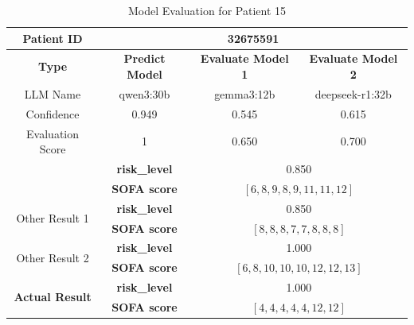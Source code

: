 \begin{table}[htbp]
 \centering
 \caption{Model Evaluation for Patient 15}
 \label{tab:patient15}
 \begin{tabular}{cccc}
 \toprule
 \textbf{ Patient ID } & \multicolumn{3}{c}{32675591} \\
 \midrule
 \textbf{ Type } & \textbf{ Predict Model } & \textbf{ Evaluate Model 1 } & \textbf{ Evaluate Model 2 } \\
 LLM Name & qwen3:30b & gemma3:12b & deepseek-r1:32b \\
 Confidence & 0.949 & 0.545 & 0.615 \\
 Evaluation Score & 1 & 0.650 & 0.700 \\
 \midrule
 \addlinespace
 \multirow{2}{*}{\textbf{ Best Result }} & \textbf{ risk\_level } & \multicolumn{2}{c}{0.850} \\
      & \textbf{ SOFA score } & \multicolumn{2}{c}{$[6, 8, 9, 8, 9, 11, 11, 12]$} \\
 \midrule
 \multirow{2}{*}{Other Result 1} & \textbf{ risk\_level } & \multicolumn{2}{c}{0.850} \\
      & \textbf{ SOFA score } & \multicolumn{2}{c}{$[8, 8, 8, 7, 7, 8, 8, 8]$} \\
 \midrule
 \multirow{2}{*}{Other Result 2} & \textbf{ risk\_level } & \multicolumn{2}{c}{1.000} \\
      & \textbf{ SOFA score } & \multicolumn{2}{c}{$[6, 8, 10, 10, 10, 12, 12, 13]$} \\
 \midrule
 \multirow{2}{*}{\textbf{ Actual Result }} & \textbf{ risk\_level } & \multicolumn{2}{c}{1.000} \\
      & \textbf{ SOFA score } & \multicolumn{2}{c}{$[4, 4, 4, 4, 4, 12, 12]$} \\
 \bottomrule
 \end{tabular}
\end{table}

